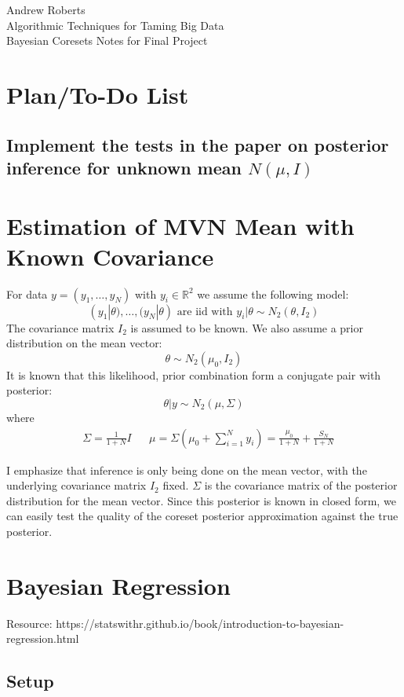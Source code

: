 \documentclass[12pt]{amsart}
\theoremstyle{plain}
\begin{document}
\begin{center}
Andrew Roberts \\
Algorithmic Techniques for Taming Big Data \\
Bayesian Coresets Notes for Final Project
\end{center}
\smallskip

\section{Plan/To-Do List}
\subsection{Implement the tests in the paper on posterior inference for unknown mean $N(\mu, I)$}

\section{Estimation of MVN Mean with Known Covariance}
For data $y = (y_1, \dots, y_N)$ with $y_i \in \mathbb{R}^2$ we assume the following model: 
\[(y_1|\theta), \dots, (y_N|\theta) \text{ are iid with } y_i|\theta \sim N_2(\theta, I_2)\]
The covariance matrix $I_2$ is assumed to be known. We also assume a prior distribution on the mean vector: 
\[\theta \sim N_2(\mu_0, I_2)\]
It is known that this likelihood, prior combination form a conjugate pair with posterior: 
\[\theta|y \sim N_2(\mu, \Sigma)\]
where 
\begin{align*} 
&\Sigma = \frac{1}{1 + N}I && \mu = \Sigma\left(\mu_0 + \sum_{i = 1}^{N} y_i\right) = \frac{\mu_0}{1 + N} + \frac{S_N}{1 + N}
\end{align*} 

I emphasize that inference is only being done on the mean vector, with the underlying covariance matrix $I_2$ fixed. $\Sigma$ is the covariance
matrix of the posterior distribution for the mean vector. Since this posterior is known in closed form, we can easily test the quality of the coreset posterior approximation
against the true posterior. 


\section{Bayesian Regression}
Resource: https://statswithr.github.io/book/introduction-to-bayesian-regression.html

\subsection{Setup}
\end{document}
